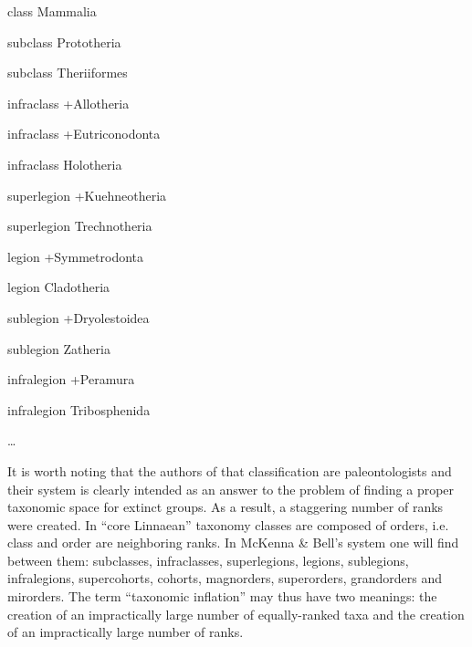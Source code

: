 \begin{artengenv}
\begin{longitemize}
\item class Mammalia
\begin{longitemize}
\item subclass Prototheria
\item subclass Theriiformes
\begin{longitemize}
\item infraclass +Allotheria
\item infraclass +Eutriconodonta
\item infraclass Holotheria
\begin{longitemize}
\item superlegion +Kuehneotheria
\item superlegion Trechnotheria
\begin{longitemize}
\item legion +Symmetrodonta
\item legion Cladotheria
\begin{longitemize}
\item sublegion +Dryolestoidea
\item sublegion Zatheria
\begin{longitemize}
\item infralegion +Peramura
\item infralegion Tribosphenida
\item \ldots
\end{longitemize}
\end{longitemize}
\end{longitemize}
\end{longitemize}
\end{longitemize}
\end{longitemize}
\end{longitemize}

It is worth noting that the authors of that classification are paleontologists and their system is clearly intended as
an answer to the problem of finding a proper taxonomic space for extinct groups. As a result, a staggering number of
ranks were created. In “core Linnaean” taxonomy classes are composed of orders, i.e. class and order are neighboring
ranks. In McKenna \& Bell’s system one will find between them: subclasses, infraclasses, superlegions, legions,
sublegions, infralegions, supercohorts, cohorts, magnorders, superorders, grandorders and mirorders. The term
“taxonomic inflation” may thus have two meanings: the creation of an impractically large number of equally-ranked taxa
and the creation of an impractically large number of ranks.


\end{artengenv}
